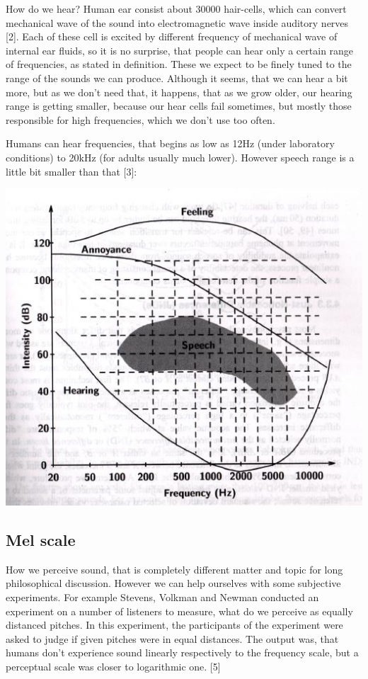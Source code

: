\documentclass[12pt,a4paper,english]{article}
\begin{document}
How do we hear? Human ear consist about 30000 hair-cells, which can convert mechanical wave of the sound into electromagnetic wave inside auditory nerves [2]. 
Each of these cell is excited by different frequency of mechanical wave of internal ear fluids, so it is no surprise, that people can hear only a certain range of frequencies, as stated in definition. These we expect to be finely tuned to the range of the sounds we can produce. Although it seems, that we can hear a bit more, but as we don't need that, it happens, that as we grow older, our hearing range is getting smaller, because our hear cells fail sometimes, but mostly those responsible for high frequencies, which we don't use too often.\newline

Humans can hear frequencies, that begins as low as 12Hz (under laboratory conditions) to 20kHz (for adults usually much lower). However speech range is a little bit smaller than that [3]: \newline

\begin{center}
    \includegraphics[scale=0.5]{speech_range.jpg}
\end {center}


\newpage
\subsection{Mel scale}

How we perceive sound, that is completely different matter and topic for long philosophical discussion. However we can help ourselves with some subjective experiments. For example Stevens, Volkman and Newman conducted an experiment on a number of listeners to measure, what do we perceive as equally distanced pitches. In this experiment, the participants of the experiment were asked to judge if given pitches were in equal distances. The output was, that humans don't experience sound linearly respectively to the frequency scale, but a perceptual scale was closer to logarithmic one. [5] \newline
\end{document}
